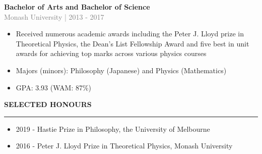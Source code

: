 \documentclass[10pt]{article}
\begin{document}
\vspace{0.5cm}
{\bf Bachelor of Arts and Bachelor of Science} \\
\textcolor{gray}{Monash University | 2013 - 2017}
\begin{small}
\begin{itemize}
  \item Received numerous academic awards including the Peter J. Lloyd prize in Theoretical Physics, 
    the Dean's List Fellowship Award and five best in unit awards for achieving top marks across various physics courses
  \item Majors (minors): Philosophy (Japanese) and Physics (Mathematics)
  \item GPA: 3.93 (WAM: 87\%)
\end{itemize}
\end{small}

\vspace{1cm}
\begin{large}
{\bf SELECTED HONOURS} \\
\textcolor{gray}{\rule{2cm}{2mm}}
\end{large}
\begin{small}
\begin{itemize}
  \item 2019 - Hastie Prize in Philosophy, the University of Melbourne
  \item 2016 - Peter J. Lloyd Prize in Theoretical Physics, Monash University
\end{itemize}
\end{small}
\end{document}
